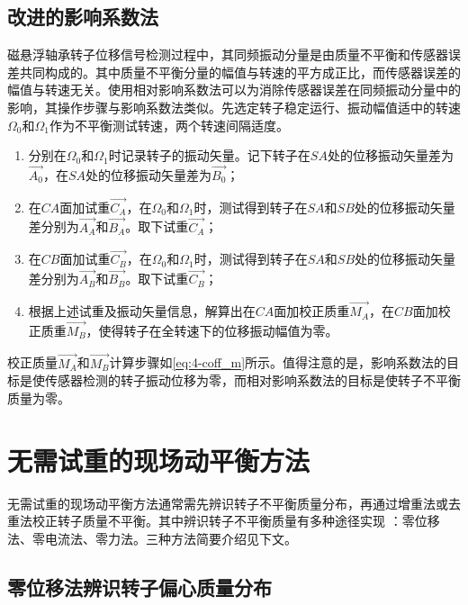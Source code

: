 \documentclass[
  lang=cn,
  degree=master,
  openany,oneside
]{nuaathesis}
\begin{document}
\subsection{改进的影响系数法}

磁悬浮轴承转子位移信号检测过程中，其同频振动分量是由质量不平衡和传感器误差共同构成的。其中质量不平衡分量的幅值与转速的平方成正比，而传感器误差的幅值与转速无关。使用相对影响系数法可以为消除传感器误差在同频振动分量中的影响，其操作步骤与影响系数法类似。先选定转子稳定运行、振动幅值适中的转速$\Omega _0$和$\Omega _1$作为不平衡测试转速，两个转速间隔适度。
\begin{enumerate}
	\item 分别在$\Omega _0$和$\Omega _1$时记录转子的振动矢量。记下转子在$SA$处的位移振动矢量差为${\overrightarrow{A_0}}$，在$SA$处的位移振动矢量差为${\overrightarrow{B_0}}$；
	\item 在$CA$面加试重${\overrightarrow{C_A}}$，在$\Omega _0$和$\Omega _1$时，测试得到转子在$SA$和$SB$处的位移振动矢量差分别为${\overrightarrow{A_A}}$和${\overrightarrow{B_A}}$。取下试重${\overrightarrow{C_A}}$；
	\item 在$CB$面加试重${\overrightarrow{C_B}}$，在$\Omega _0$和$\Omega _1$时，测试得到转子在$SA$和$SB$处的位移振动矢量差分别为${\overrightarrow{A_B}}$和${\overrightarrow{B_B}}$。取下试重${\overrightarrow{C_B}}$；
	\item 根据上述试重及振动矢量信息，解算出在$CA$面加校正质重${\overrightarrow{M_A}}$，在$CB$面加校正质重${\overrightarrow{M_B}}$，使得转子在全转速下的位移振动幅值为零。
\end{enumerate}

校正质量${\overrightarrow{M_A}}$和${\overrightarrow{M_B}}$计算步骤如\autoref{eq:4-coff_m}所示。值得注意的是，影响系数法的目标是使传感器检测的转子振动位移为零，而相对影响系数法的目标是使转子不平衡质量为零。

\section{无需试重的现场动平衡方法}
无需试重的现场动平衡方法通常需先辨识转子不平衡质量分布，再通过增重法或去重法校正转子质量不平衡。其中辨识转子不平衡质量有多种途径实现
：零位移法、零电流法、零力法。三种方法简要介绍见下文。

\subsection{零位移法辨识转子偏心质量分布}
\end{document}
